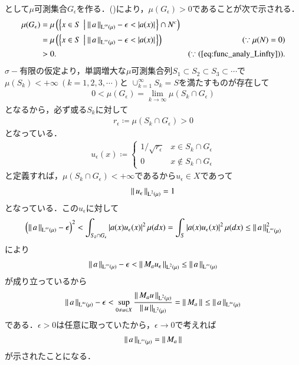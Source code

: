 \begin{prf}
\begin{description}
\begin{align}
		\end{align}
		として$\mu$可測集合$G_\epsilon$を作る．()により，$\mu(G_\epsilon) > 0$であることが次で示される．
		\begin{align}
			\mu(G_\epsilon) &= \mu\left(\left\{x \in S\ \left|\ \Norm{a}{\Lp{\infty}{\mu}}-\epsilon < |a(x)|\right.\right\} \cap N^c\right) \\
			&= \mu\left(\left\{x \in S\ \left|\ \Norm{a}{\Lp{\infty}{\mu}}-\epsilon < |a(x)|\right.\right\}\right) & (\because \mu(N)=0) \\
			&> 0. & (\because (\refeq{eq:func_analy_Linfty})).
 		\end{align}
		$\sigma-$有限の仮定より，単調増大な$\mu$可測集合列$S_1 \subset S_2 \subset S_3 \subset \cdots$で$\mu(S_k) < +\infty\ (k=1,2,3,\cdots)$と
		$\cup_{k=1}^{\infty}S_k = S$を満たすものが存在して
		\begin{align}
			0 < \mu(G_\epsilon) = \lim_{k \to \infty} \mu(S_k \cap G_\epsilon)
		\end{align}
		となるから，必ず或る$S_{k}$に対して
		\begin{align}
			r_\epsilon \coloneqq \mu(S_{k} \cap G_\epsilon) > 0
		\end{align}
		となっている．
		\begin{align}
			u_\epsilon(x) \coloneqq 
			\begin{cases}
				1/\sqrt{r_\epsilon} & x \in S_{k} \cap G_\epsilon \\
				0 & x \notin S_{k} \cap G_\epsilon
			\end{cases}
		\end{align}
		と定義すれば，$\mu(S_{k} \cap G_\epsilon) < +\infty$であるから$u_\epsilon \in X$であって
		\begin{align}
			\left\|\, u_\epsilon\, \right\|_{\operatorname{L}^{2} \left(\mu\right)} = 1
		\end{align}
		となっている．この$u_\epsilon$に対して
		\begin{align}
			\left(\left\|\, a\, \right\|_{\operatorname{L}^{\infty} \left(\mu\right)} - \epsilon\right)^2 
			< \int_{S_k \cap G_\epsilon} |a(x)u_\epsilon(x)|^2\, \mu(dx) 
			= \int_{S} |a(x)u_\epsilon(x)|^2\, \mu(dx)
			\leq \left\|\, a\, \right\|_{\operatorname{L}^{\infty} \left(\mu\right)}^2
		\end{align}
		により
		\begin{align}
			\left\|\, a\, \right\|_{\operatorname{L}^{\infty} \left(\mu\right)} - \epsilon < \left\|\, M_a u_\epsilon\, \right\|_{\operatorname{L}^{2} \left(\mu\right)} \leq \left\|\, a\, \right\|_{\operatorname{L}^{\infty} \left(\mu\right)}
		\end{align}
		が成り立っているから
		\begin{align}
			\left\|\, a\, \right\|_{\operatorname{L}^{\infty} \left(\mu\right)} - \epsilon 
			< \operatorname*{sup}_{0 \neq u \in X} \frac{\left\|\, M_a u\, \right\|_{\operatorname{L}^{2} \left(\mu\right)}}{\left\|\, u\, \right\|_{\operatorname{L}^{2} \left(\mu\right)}} = \left\|\, M_a\, \right\|_{} 
			\leq \left\|\, a\, \right\|_{\operatorname{L}^{\infty} \left(\mu\right)}
		\end{align}
		である．$\epsilon > 0$は任意に取っていたから，$\epsilon \rightarrow 0$で考えれば
		\begin{align}
			\left\|\, a\, \right\|_{\operatorname{L}^{\infty} \left(\mu\right)} = \left\|\, M_a\, \right\|_{}
		\end{align}
		が示されたことになる．
		

\end{description}
\end{prf}
